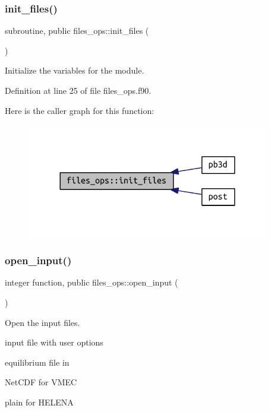 \subsubsection{\texorpdfstring{init\+\_\+files()}{init\_files()}}
{\footnotesize\ttfamily subroutine, public files\+\_\+ops\+::init\+\_\+files (\begin{DoxyParamCaption}{ }\end{DoxyParamCaption})}



Initialize the variables for the module. 



Definition at line 25 of file files\+\_\+ops.\+f90.

Here is the caller graph for this function\+:\nopagebreak
\begin{figure}[H]
\begin{center}
\leavevmode
\includegraphics[width=300pt]{namespacefiles__ops_a1e219b1147f109f758d03bef89d540e8_icgraph}
\end{center}
\end{figure}
\mbox{\label{namespacefiles__ops_a63a81a5a451f787025429878b2cec81b}} 
\subsubsection{\texorpdfstring{open\+\_\+input()}{open\_input()}}
{\footnotesize\ttfamily integer function, public files\+\_\+ops\+::open\+\_\+input (\begin{DoxyParamCaption}{ }\end{DoxyParamCaption})}



Open the input files. 


\begin{DoxyItemize}
\item input file with user options
\item equilibrium file in
\begin{DoxyItemize}
\item Net\+C\+DF for V\+M\+EC
\item plain for H\+E\+L\+E\+NA
\end{DoxyItemize}
\end{DoxyItemize}

